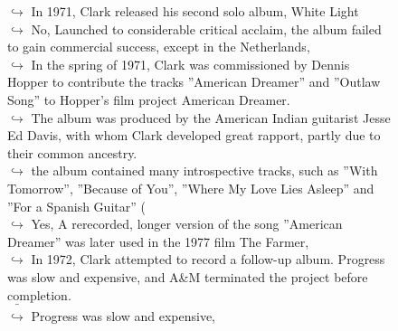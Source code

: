 \documentclass[11pt,a4paper, onecolumn]{article}
\begin{document}
\begin{figure}[t] \small \begin{tcolorbox}[boxsep=0pt,left=5pt,right=0pt,top=2pt,colback = yellow!5] \begin{dialogue}
 \small 
\colorbox{pink!25}{$\hookrightarrow$}
{ In 1971, Clark released his second solo album, White Light }
\\
\colorbox{pink!25}{$\hookrightarrow$}
\colorbox{red!25}{No,}
{ Launched to considerable critical acclaim, the album failed to gain commercial success, except in the Netherlands, }
\\
\colorbox{pink!25}{$\hookrightarrow$}
{ In the spring of 1971, Clark was commissioned by Dennis Hopper to contribute the tracks ''American Dreamer'' and ''Outlaw Song'' to Hopper's film project American Dreamer. }
\\
\colorbox{pink!25}{$\hookrightarrow$}
{ The album was produced by the American Indian guitarist Jesse Ed Davis, with whom Clark developed great rapport, partly due to their common ancestry. }
\\
\colorbox{pink!25}{$\hookrightarrow$}
{ the album contained many introspective tracks, such as ''With Tomorrow'', ''Because of You'', ''Where My Love Lies Asleep'' and ''For a Spanish Guitar'' ( }
\\
\colorbox{pink!25}{$\hookrightarrow$}
\colorbox{red!25}{Yes,}
{ A rerecorded, longer version of the song ''American Dreamer'' was later used in the 1977 film The Farmer, }
\\
\colorbox{pink!25}{$\hookrightarrow$}
{ In 1972, Clark attempted to record a follow-up album. Progress was slow and expensive, and A&M terminated the project before completion. }
\\
\colorbox{pink!25}{ $\bar{\hookrightarrow}$}
{ Progress was slow and expensive, }
 \end{dialogue}\end{tcolorbox}\end{figure}
\end{document}
